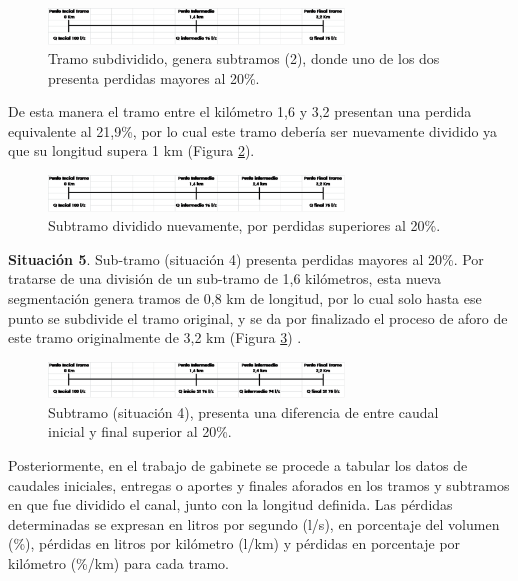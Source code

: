 \documentclass[]{article}
\begin{document}
\begin{figure}[H]
\centering
\includegraphics[width=0.7\textwidth]{images/sit_4.eps}
\caption{Tramo subdividido, genera subtramos (2), donde uno de los dos presenta perdidas mayores al 20\%.}
\label{sit_4}
\end{figure}

De esta manera el tramo entre el kilómetro 1,6 y 3,2 presentan una perdida equivalente al 21,9\%, por lo cual este tramo debería ser nuevamente dividido ya que su longitud supera 1 km (Figura \ref{sit_4_1}).\\

\begin{figure}[H]
\centering
\includegraphics[width=0.7\textwidth]{images/sit_4_1.eps}
\caption{Subtramo dividido nuevamente, por perdidas superiores al 20\%.}
\label{sit_4_1}
\end{figure}

\textbf{Situación 5}. Sub-tramo (situación 4) presenta perdidas mayores al 20\%. Por tratarse de una división de un sub-tramo de 1,6 kilómetros, esta nueva segmentación genera tramos de 0,8 km de longitud, por lo cual solo hasta ese punto se subdivide el tramo original, y se da por finalizado el proceso de aforo de este tramo originalmente de 3,2 km (Figura \ref{sit_5}) .\\

\begin{figure}[H]
\centering
\includegraphics[width=0.7\textwidth]{images/sit_5.eps}
\caption{Subtramo (situación 4), presenta una diferencia de entre caudal inicial y final superior al 20\%.}
\label{sit_5}
\end{figure}

Posteriormente, en el trabajo de gabinete se procede a tabular los datos de caudales iniciales, entregas o aportes y finales aforados en los tramos y subtramos en que fue dividido el canal, junto con la longitud definida. Las pérdidas determinadas se expresan en litros por segundo (l/s), en porcentaje del volumen (\%), pérdidas en litros por kilómetro (l/km) y pérdidas en porcentaje por kilómetro (\%/km) para cada tramo.
\end{document}
